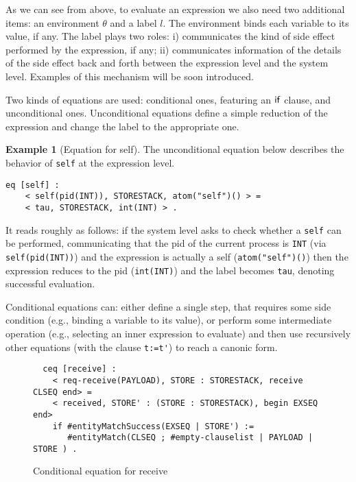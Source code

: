 \documentclass{article}[12pt,a4paper]
\theoremstyle{definition}
\newtheorem{example}{Example}[section]
\begin{document}
As we can see from above, to evaluate an expression we also need two additional items:
an environment $\theta$ and a label $l$. The environment binds each variable to its
value, if any. The label plays two roles:
i) communicates the kind of side effect performed by the expression, if any; ii) communicates information of the details of the side effect back and
forth between the expression level and the system level. Examples of this mechanism will be soon introduced.

Two kinds of equations are used: conditional ones, featuring an
$\mathsf{if}$ clause, and unconditional ones. Unconditional equations
define a simple reduction of the expression and change the label to
the appropriate one.

\begin{example}[Equation for self]
The unconditional equation below describes the behavior of \verb+self+ at the expression level.
\begin{verbatim}
eq [self] :
    < self(pid(INT)), STORESTACK, atom("self")() > =
    < tau, STORESTACK, int(INT) > .
\end{verbatim}
It reads roughly as follows: if the system level asks to check whether a \verb+self+ can be performed, communicating that the pid of the current process is \verb+INT+ (via \verb+self(pid(INT))+) and the expression is actually a self (\verb+atom("self")()+) then the expression reduces to the pid (\verb+int(INT)+) and the label becomes \verb+tau+, denoting successful evaluation.
\end{example}

Conditional equations can: either define a single step, that requires
some side condition (e.g., binding a variable to its value), or
perform some intermediate operation (e.g., selecting an inner
expression to evaluate) and then use recursively other equations (with the clause \verb+t:=t'+) to
reach a canonic form.

\begin{figure}[t]
  \centering
\begin{verbatim}
  ceq [receive] :
    < req-receive(PAYLOAD), STORE : STORESTACK, receive CLSEQ end> =
    < received, STORE' : (STORE : STORESTACK), begin EXSEQ end>
    if #entityMatchSuccess(EXSEQ | STORE') := 
       #entityMatch(CLSEQ ; #empty-clauselist | PAYLOAD | STORE ) .
\end{verbatim}
  \caption{Conditional equation for receive}
  \label{fig:eq-rec}
\end{figure}
\end{document}
